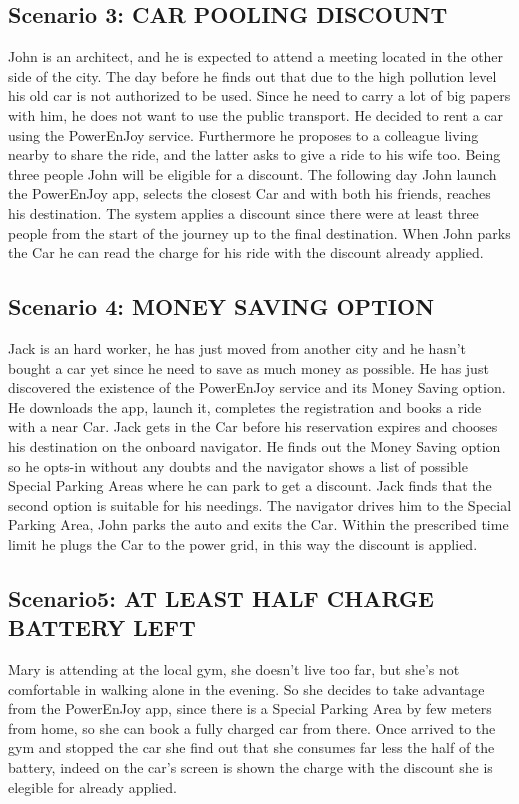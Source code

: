 \documentclass{article}
\begin{document}
\subsection{Scenario 3: CAR POOLING DISCOUNT}
John is an architect, and he is expected to attend a meeting located in the other side of the city. The day before he finds out that due to the high pollution level his old car is not authorized to be used. Since he need to carry a lot of big papers with him, he does not want to use the public transport. He decided to rent a car using the PowerEnJoy service. Furthermore he proposes to a colleague living nearby to share the ride, and the latter asks to give a ride to his wife too. Being three people John will be eligible for a discount. The following day John launch the PowerEnJoy app, selects the closest Car and with both his friends, reaches his destination. The system applies a discount since there were at least three people from the start of the journey up to the final destination. When John parks the Car he can read the charge for his ride with the discount already applied.
\subsection{Scenario 4: MONEY SAVING OPTION}
Jack is an hard worker, he has just moved from another city and he hasn't bought a car yet since he need to save as much money as possible. He has just discovered the existence of the PowerEnJoy service and its Money Saving option. He downloads the app, launch it, completes the registration and books a ride with a near Car. Jack gets in the Car before his reservation expires and chooses his destination on the onboard navigator. He finds out the Money Saving option so he opts-in without any doubts and the navigator shows a list of possible Special Parking Areas where he can park to get a discount. Jack finds that the second option is suitable for his needings. The navigator drives him to the Special Parking Area, John parks the auto and exits the Car. Within the prescribed time limit he plugs the Car to the power grid, in this way the discount is applied. 
\subsection{Scenario5: AT LEAST HALF CHARGE BATTERY LEFT}
Mary is attending at the local gym, she doesn't live too far, but she's not comfortable in walking alone in the evening. So she decides to take advantage from the PowerEnJoy app, since there is a Special Parking Area by few meters from home, so she can book a fully charged car from there. Once arrived to the gym and stopped the car she find out that she consumes far less the half of the battery, indeed on the car's screen is shown the charge with the discount she is elegible for already applied. %
\end{document}

